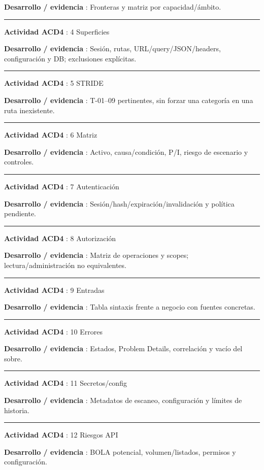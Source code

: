 \documentclass[12pt,a4paper]{report}
\begin{document}
\textbf{Desarrollo / evidencia }: Fronteras y matriz por
capacidad/ámbito.

\medskip\hrule\medskip

\textbf{Actividad ACD4 }: 4 Superficies

\textbf{Desarrollo / evidencia }: Sesión, rutas, URL/query/JSON/headers,
configuración y DB; exclusiones explícitas.

\medskip\hrule\medskip

\textbf{Actividad ACD4 }: 5 STRIDE

\textbf{Desarrollo / evidencia }: T-01--09 pertinentes, sin forzar una
categoría en una ruta inexistente.

\medskip\hrule\medskip

\textbf{Actividad ACD4 }: 6 Matriz

\textbf{Desarrollo / evidencia }: Activo, causa/condición, P/I, riesgo
de escenario y controles.

\medskip\hrule\medskip

\textbf{Actividad ACD4 }: 7 Autenticación

\textbf{Desarrollo / evidencia }: Sesión/hash/expiración/invalidación y
política pendiente.

\medskip\hrule\medskip

\textbf{Actividad ACD4 }: 8 Autorización

\textbf{Desarrollo / evidencia }: Matriz de operaciones y scopes;
lectura/administración no equivalentes.

\medskip\hrule\medskip

\textbf{Actividad ACD4 }: 9 Entradas

\textbf{Desarrollo / evidencia }: Tabla sintaxis frente a negocio con
fuentes concretas.

\medskip\hrule\medskip

\textbf{Actividad ACD4 }: 10 Errores

\textbf{Desarrollo / evidencia }: Estados, Problem Details, correlación
y vacío del sobre.

\medskip\hrule\medskip

\textbf{Actividad ACD4 }: 11 Secretos/config

\textbf{Desarrollo / evidencia }: Metadatos de escaneo, configuración y
límites de historia.

\medskip\hrule\medskip

\textbf{Actividad ACD4 }: 12 Riesgos API

\textbf{Desarrollo / evidencia }: BOLA potencial, volumen/listados,
permisos y configuración.
\end{document}

